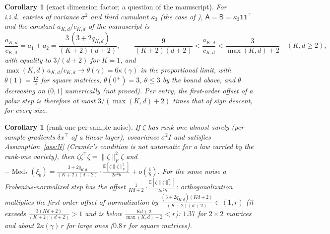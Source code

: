 \documentclass[10pt]{article}
\newtheorem{corollary}[theorem]{Corollary}
\theoremstyle{definition}
\theoremstyle{remark}
\newcommand{\E}{\mathbb{E}}
\newcommand{\nF}[1]{\|#1\|_{F}}
\newcommand{\Med}{\operatorname{Med}}
\newcommand{\cA}{\mathsf{A}}
\newcommand{\cB}{\mathsf{B}}
\newcommand{\ones}{\mathbf{1}}
\begin{document}
\begin{corollary}[exact dimension factor; a question of the manuscript]\label{cor:dim}
For i.i.d.\ entries of variance $\sigma^2$ and third cumulant $\kappa_3$ (the case of \cite[Proposition~4]{manuscript}),
$\cA=\cB=\kappa_3\ones\ones^\top$ and the constant $a_{K,d}/c_{K,d}$ of the manuscript is
\[
\frac{a_{K,d}}{c_{K,d}}=a_1+a_2=\frac{3\,(3+2q_{K,d})}{(K+2)(d+2)},\qquad
\frac{9}{(K+2)(d+2)}<\frac{a_{K,d}}{c_{K,d}}<\frac{3}{\max(K,d)+2}\quad(K,d\ge2),
\]
with equality to $3/(d+2)$ for $K=1$, and $\max(K,d)\,a_{K,d}/c_{K,d}\to\theta(\gamma)=6\kappa(\gamma)$ in
the proportional limit, with $\theta(1)=\frac{12}5$ for square matrices, $\theta(0^+)=3$, $\theta\le3$ by the bound above,
and $\theta$ decreasing on $(0,1]$ numerically (not proved). Per entry, the first-order offset of a polar step is
therefore at most $3/(\max(K,d)+2)$ times that of sign descent, for every size.
\end{corollary}

\begin{corollary}[rank-one per-sample noise]\label{cor:rank1}
If $\zeta$ has rank one almost surely (per-sample gradients $\delta x^\top$ of a linear layer), covariance $\sigma^2I$
and satisfies Assumption~\ref{ass:N} (Cram\'er's condition is not automatic for a law carried by the rank-one variety),
then $\zeta\zeta^\top\zeta=\nF\zeta^2\zeta$ and
$-\Med_\ast(\xi_b)=\frac{3+2q_{K,d}}{(K+2)(d+2)}\cdot\frac{\E[\zeta\nF\zeta^2]}{2\sigma^2b}+o(\frac1b)$. For the same noise a
Frobenius-normalized step has the offset $\frac{1}{Kd+2}\cdot\frac{\E[\zeta\nF\zeta^2]}{2\sigma^2b}$: orthogonalization
multiplies the first-order offset of normalization by $\frac{(3+2q_{K,d})(Kd+2)}{(K+2)(d+2)}\in(1,r)$ (it exceeds
$\frac{3(Kd+2)}{(K+2)(d+2)}>1$ and is below $\frac{Kd+2}{\max(K,d)+2}<r$): $1.37$ for $2\times2$ matrices and about
$2\kappa(\gamma)\,r$ for large ones ($0.8\,r$ for square matrices).
\end{corollary}
\end{document}
